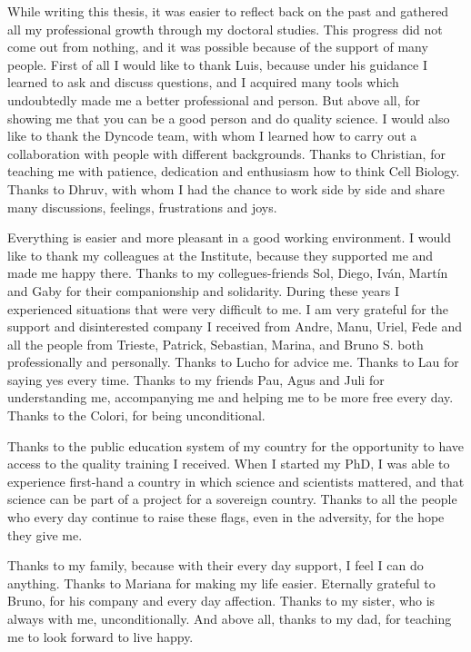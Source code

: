 \documentclass[./main.tex]{subfiles}
\begin{document}

    

While writing this thesis, it was easier to reflect back on the past and gathered all my professional growth through my doctoral studies. This progress did not come out from nothing, and it was possible because of the support of many people. First of all I would like to thank Luis, because under his guidance I learned to ask and discuss questions, and I acquired many tools which undoubtedly made me a better professional and person. But above all, for showing me that you can be a good person and do quality science. I would also like to thank the Dyncode team, with whom I learned how to carry out a collaboration with people with different backgrounds. Thanks to Christian, for teaching me with patience, dedication and enthusiasm how to think Cell Biology. Thanks to Dhruv, with whom I had the chance to work side by side and share many discussions, feelings, frustrations and joys. 


Everything is easier and more pleasant in a good working environment. I would like to thank my colleagues at the Institute, because they supported me and made me happy there. Thanks to my collegues-friends Sol, Diego, Iván, Martín and Gaby for their companionship and solidarity. During these years I experienced situations that were very difficult to me. I am very grateful for the support and disinterested company I received from Andre, Manu, Uriel, Fede and all the people from Trieste, Patrick, Sebastian, Marina, and Bruno S. both professionally and personally. Thanks to Lucho for advice me. Thanks to Lau for saying yes every time. Thanks to my friends Pau, Agus and Juli for understanding me, accompanying me and helping me to be more free every day. Thanks to the Colori, for being unconditional. 

Thanks to the public education system of my country for the opportunity to have access to the quality training I received. When I started my PhD, I was able to experience first-hand a country in which science and scientists mattered, and that science can be part of a project for a sovereign country. Thanks to all the people who every day continue to raise these flags, even in the adversity, for the hope they give me. 

Thanks to my family, because with their every day support, I feel I can do anything. Thanks to Mariana for making my life easier. Eternally grateful to Bruno, for his company and every day affection. Thanks to my sister, who is always with me, unconditionally. And above all, thanks to my dad, for teaching me to look forward to live happy.  
\end{document}
